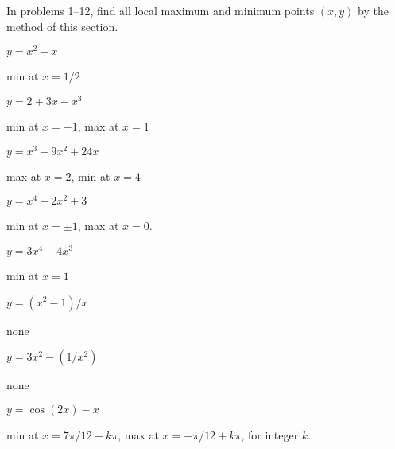 \begin{exercises} 
\noindent In problems 1--12, find all local maximum and minimum points
$(x,y)$ by the method of this section.

\twocol
\begin{exercise} $y=x^2-x$ 
\begin{answer} min at $x=1/2$
\end{answer}\end{exercise}

\begin{exercise} $y=2+3x-x^3$ 
\begin{answer} min at $x=-1$, max at $x=1$
\end{answer}\end{exercise}

\begin{exercise} $y=x^3-9x^2+24x$
\begin{answer} max at $x=2$, min at $x=4$
\end{answer}\end{exercise}

\begin{exercise} $y=x^4-2x^2+3$ 
\begin{answer} min at $x=\pm 1$, max at $x=0$.
\end{answer}\end{exercise}

\begin{exercise} $y=3x^4-4x^3$
\begin{answer} min at $x=1$
\end{answer}\end{exercise}

\begin{exercise} $y=(x^2-1)/x$
\begin{answer} none
\end{answer}\end{exercise}

\begin{exercise} $y=3x^2-(1/x^2)$ 
\begin{answer} none
\end{answer}\end{exercise}

\begin{exercise} $y=\cos(2x)-x$ 
\begin{answer} min at $x=7\pi/12+k\pi$, max at $x=-\pi/12+k\pi$, for integer $k$.
\end{answer}\end{exercise}


\end{exercises}
